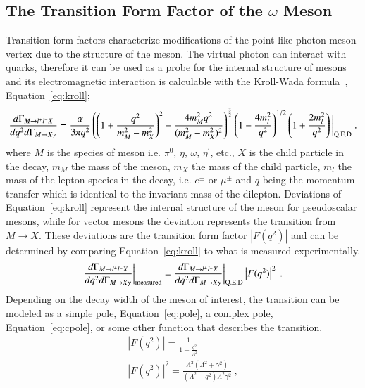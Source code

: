 \documentclass{aip-cp}
\begin{document}
\subsection{The Transition Form Factor  of the $\omega$ Meson}
Transition form factors characterize modifications of the point-like photon-meson vertex due to the structure of the meson. The virtual photon can interact with quarks, therefore it can be used as a probe for the internal structure of mesons and its electromagnetic interaction is calculable with the Kroll-Wada formula~\cite{bib4}, Equation~\ref{eq:kroll};
\begin{equation}
\frac{d\Gamma_{M{\rightarrow l^{+}l^{-}X}}}{dq^{2} d\Gamma_{M{\rightarrow X\gamma}}} = \frac{\alpha}{3\pi q^{2}}\left(\left(1+\frac{q^{2}}{m^{2}_{M}-m^{2}_{X}}\right)^2 - \frac{4m^{2}_{M}q^2}{(m^{2}_{M}-m^{2}_{X})^2}\right)^\frac{3}{2}\left(1-\frac{4m_{l}^{2}}{q^{2}}\right)^{1/2}\left(1+\frac{2m_{l}^{2}}{q^{2}}\right) \bigg|_{\mathrm{Q.E.D}}  \label{eq:kroll} \ . \\
\end{equation}
 where $M$ is the species of meson i.e. $\pi^0$, $\eta$, $\omega$, $\eta^{\prime}$, etc., $X$ is the child particle in the decay, $m_M$ the mass of the meson, $m_X$ the mass of the child particle, $m_l$ the mass of the lepton species in the decay, i.e. $e^{\pm}$ or $\mu^{\pm}$ and $q$ being the momentum transfer which is identical to the invariant mass of the dilepton. Deviations of Equation~\ref{eq:kroll} represent the internal structure of the meson for pseudoscalar mesons, while for vector mesons the deviation represents the transition from $M \to X$. These deviations are the transition form factor $\left| F(q^2)\right|$ and can be determined by comparing Equation~\ref{eq:kroll} to what is measured experimentally.
 \begin{equation}
 \frac{d\Gamma_{M{\rightarrow l^{+}l^{-}X}}}{dq^{2} d\Gamma_{M{\rightarrow X\gamma}}}\bigg|_{\mathrm{measured}} =   \frac{d\Gamma_{M{\rightarrow l^{+}l^{-}X}}}{dq^{2} d\Gamma_{M{\rightarrow X\gamma}}} \bigg|_{\mathrm{Q.E.D}} \left| F(q^2)\right|^2 \label{eq:kroll_ff} \ . \\
 \end{equation}
 Depending on the decay width of the meson of interest, the transition can be modeled as a simple pole, Equation~\ref{eq:pole}, a complex pole, Equation~\ref{eq:cpole}, or some other function that describes the transition.
 \begin{eqnarray}
\left| F(q^2)\right| = \frac{1}{1-\frac{q^2}{\Lambda^2}} \label{eq:pole} \\
\left| F(q^2)\right|^2 = \frac{\Lambda^2(\Lambda^2 + \gamma^2)}{(\Lambda^2 - q^2)\Lambda^2 \gamma^2} \label{eq:cpole} \ ,
 \end{eqnarray} 
\end{document}
